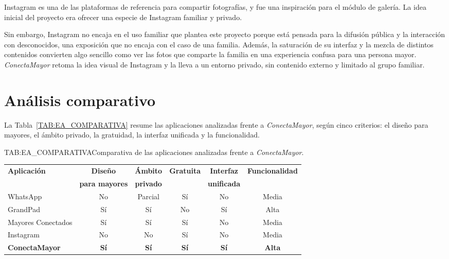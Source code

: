 Instagram \cite{instagram} es una de las plataformas de referencia para
compartir fotografías, y fue una inspiración para el módulo de
galería. La idea inicial del proyecto era ofrecer una especie de Instagram
familiar y privado.

Sin embargo, Instagram no encaja en el uso familiar que plantea este
proyecto porque está pensada para la difusión pública y
la interacción con desconocidos, una exposición que no
encaja con el caso de una familia. Además, la saturación de su
interfaz y la mezcla de distintos contenidos convierten algo sencillo
como ver las fotos que comparte la familia en una experiencia confusa
para una persona mayor. \emph{ConectaMayor} retoma la idea visual de
Instagram y la lleva a un entorno privado, sin contenido externo y
limitado al grupo familiar.


\section{Análisis comparativo\label{SEC:EA_COMPARATIVA}}

La Tabla~\ref{TAB:EA_COMPARATIVA} resume las aplicaciones analizadas frente
a \emph{ConectaMayor}, según cinco criterios: el diseño para mayores, el
ámbito privado, la gratuidad, la interfaz unificada y la funcionalidad.

\begin{table}[Comparativa de aplicaciones]{TAB:EA_COMPARATIVA}{Comparativa de las aplicaciones analizadas frente a \emph{ConectaMayor}.}
\small
\begin{tabular}{lccccc}
\toprule
\textbf{Aplicación} & \textbf{Diseño} & \textbf{Ámbito} & \textbf{Gratuita} & \textbf{Interfaz} & \textbf{Funcionalidad} \\
& \textbf{para mayores} & \textbf{privado} & & \textbf{unificada} & \\
\midrule
    WhatsApp             & No  & Parcial & Sí  & No  & Media \\
    GrandPad             & Sí  & Sí      & No  & Sí  & Alta \\
    Mayores Conectados   & Sí  & Sí      & Sí  & No  & Media \\
    Instagram            & No  & No      & Sí  & No  & Media \\
\midrule
\textbf{ConectaMayor} & \textbf{Sí} & \textbf{Sí} & \textbf{Sí} & \textbf{Sí} & \textbf{Alta} \\
\bottomrule
\end{tabular}
\end{table}

